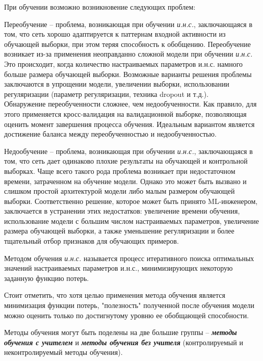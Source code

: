 При обучении возможно возникновение следующих проблем:

\begin{textitemize}
	\item Переобучение -- проблема, возникающая при обучении  \textit{и.н.с.}, заключающаяся в том,
	что сеть хорошо адаптируется к паттернам входной активности из обучающей выборки, при этом теряя способность к обобщению.
	Переобучение возникает из-за применения неоправданно сложной модели при обучении  \textit{и.н.с.} Это происходит,
	когда количество настраиваемых параметров и.н.с. намного больше размера обучающей выборки. Возможные
	варианты решения проблемы заключаются в упрощении модели, увеличении выборки, использовании регуляризации
	(параметр регуляризации, техника dropout и т.д.).\\
	Обнаружение переобученности сложнее, чем недообученности. Как правило, для этого применяется
	кросс-валидация на валидационной выборке, позволяющая оценить момент завершения процесса обучения.
	Идеальным вариантом является достижение баланса между переобученностью и недообученностью.

	\item Недообучение -- проблема, возникающая при обучении  \textit{и.н.с.}, заключающаяся в том,
	что сеть дает одинаково плохие результаты на обучающей и контрольной выборках.
	Чаще всего такого рода проблема возникает при недостаточном времени, затраченном на обучение модели.
	Однако это может быть вызвано и слишком простой архитектурой модели либо малым размером обучающей
	выборки. Соответственно решение, которое может быть принято ML-инженером, заключается в устранении
	этих недостатков: увеличение времени обучения, использование модели с большим числом настраиваемых
	параметров, увеличение размера обучающей выборки, а также уменьшение регуляризации и более тщательный
	отбор признаков для обучающих примеров.
\end{textitemize}

Методом обучения \textit{и.н.с.} называется процесс итеративного поиска оптимальных значений настраиваемых параметров и.н.с., минимизирующих некоторую заданную функцию потерь.

Стоит отметить, что хотя целью применения метода обучения является минимизация функции потерь, "полезность" полученной после обучения модели можно оценить только по достигнутому уровню ее обобщающей способности.

Методы обучения могут быть поделены на две большие группы -- \textit{\textbf{методы обучения с учителем}} и \textit{\textbf{методы обучения без учителя}} (контролируемый и неконтролируемый методы обучения).

